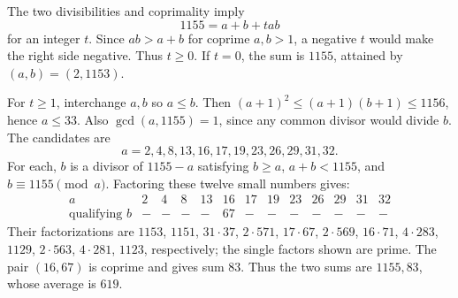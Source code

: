 The two divisibilities and coprimality imply
\[
1155=a+b+tab
\]
for an integer $t$. Since $ab>a+b$ for coprime $a,b>1$, a negative $t$ would make the right side negative. Thus $t\ge0$. If $t=0$, the sum is $1155$, attained by $(a,b)=(2,1153)$.

For $t\ge1$, interchange $a,b$ so $a\le b$. Then $(a+1)^2\le(a+1)(b+1)\le1156$, hence $a\le33$. Also $\gcd(a,1155)=1$, since any common divisor would divide $b$. The candidates are
\[
a=2,4,8,13,16,17,19,23,26,29,31,32.
\]
For each, $b$ is a divisor of $1155-a$ satisfying $b\ge a$, $a+b<1155$, and $b\equiv1155\pmod a$. Factoring these twelve small numbers gives:
\[
\begin{array}{c|rrrrrrrrrrrr}
a&2&4&8&13&16&17&19&23&26&29&31&32\\ \hline
\text{qualifying }b&-&-&-&-&67&-&-&-&-&-&-&-
\end{array}
\]
Their factorizations are $1153$, $1151$, $31\cdot37$, $2\cdot571$, $17\cdot67$, $2\cdot569$, $16\cdot71$, $4\cdot283$, $1129$, $2\cdot563$, $4\cdot281$, $1123$, respectively; the single factors shown are prime. The pair $(16,67)$ is coprime and gives sum $83$. Thus the two sums are $1155,83$, whose average is $\boxed{619}$.

